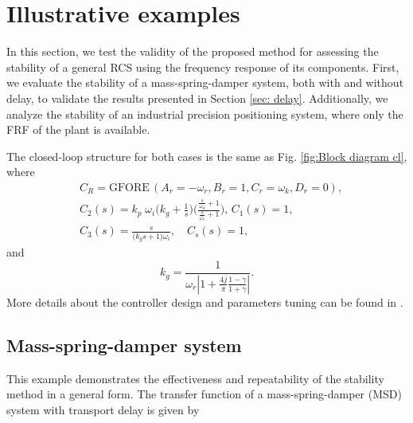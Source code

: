 \section{Illustrative examples} \label{sec: example}
In this section, we test the validity of the proposed method for assessing the stability of a general RCS using the frequency response of its components. First, we evaluate the stability of a mass-spring-damper system, both with and without delay, to validate the results presented in Section \ref{sec: delay}. Additionally, we analyze the stability of an industrial precision positioning system, where only the FRF of the plant is available.

The closed-loop structure for both cases is the same as Fig. \ref{fig:Block diagram cl}, where
\begin{equation}
\begin{split}
    \label{eq:controllers}
    &C_R=\text{GFORE}\,(A_r=-\omega_r, B_r=1, C_r=\omega_k, D_r=0), \\
   &C_2(s)=k_p\;\omega_{i}\bigg(k_{g}+\frac{1}{s}\bigg)\bigg(\frac{\frac{s}{\omega_d}+1}{\frac{s}{\omega_t}+1}\bigg),\, C_1(s)=1,  \\
   &C_3(s)=\frac{s}{\Big(k_{g} s+1\Big)\omega_{i}},\quad C_s(s)=1,
\end{split}
\end{equation}
and
\begin{equation}
    k_{g}=\frac{1}{\omega_r|1+\frac{4j}{\pi}\frac{1-\gamma}{1+\gamma}|}.
\end{equation}
More details about the controller design and parameters tuning can be found in \cite{Yixuan}.

\subsection{Mass-spring-damper system}
This example demonstrates the effectiveness and repeatability of the stability method in a general form. The transfer function of a mass-spring-damper (MSD) system with transport delay is given by

